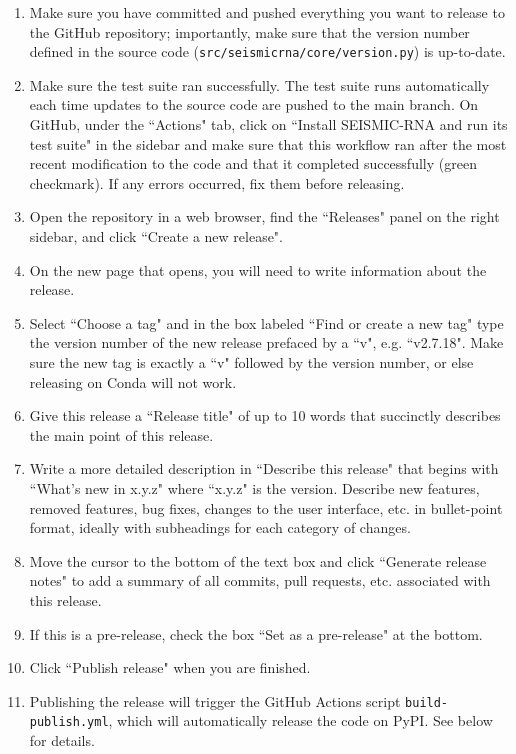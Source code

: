 \documentclass[main.tex]{subfiles}
\begin{document}
\begin{enumerate}
    \item Make sure you have committed and pushed everything you want to release to the GitHub repository; importantly, make sure that the version number defined in the source code (\verb|src/seismicrna/core/version.py|) is up-to-date.
    \item Make sure the test suite ran successfully. The test suite runs automatically each time updates to the source code are pushed to the main branch. On GitHub, under the ``Actions" tab, click on ``Install SEISMIC-RNA and run its test suite" in the sidebar and make sure that this workflow ran after the most recent modification to the code and that it completed successfully (green checkmark). If any errors occurred, fix them before releasing.
    \item Open the repository in a web browser, find the ``Releases" panel on the right sidebar, and click ``Create a new release".
    \item On the new page that opens, you will need to write information about the release.
    \item Select ``Choose a tag" and in the box labeled ``Find or create a new tag" type the version number of the new release prefaced by a ``v", e.g. ``v2.7.18". Make sure the new tag is exactly a ``v" followed by the version number, or else releasing on Conda will not work.
    \item Give this release a ``Release title" of up to 10 words that succinctly describes the main point of this release.
    \item Write a more detailed description in ``Describe this release" that begins with ``What's new in x.y.z" where ``x.y.z" is the version. Describe new features, removed features, bug fixes, changes to the user interface, etc. in bullet-point format, ideally with subheadings for each category of changes.
    \item Move the cursor to the bottom of the text box and click ``Generate release notes" to add a summary of all commits, pull requests, etc. associated with this release.
    \item If this is a pre-release, check the box ``Set as a pre-release" at the bottom.
    \item Click ``Publish release" when you are finished.
    \item Publishing the release will trigger the GitHub Actions script \verb|build-publish.yml|, which will automatically release the code on PyPI. See below for details.
\end{enumerate}
\end{document}
